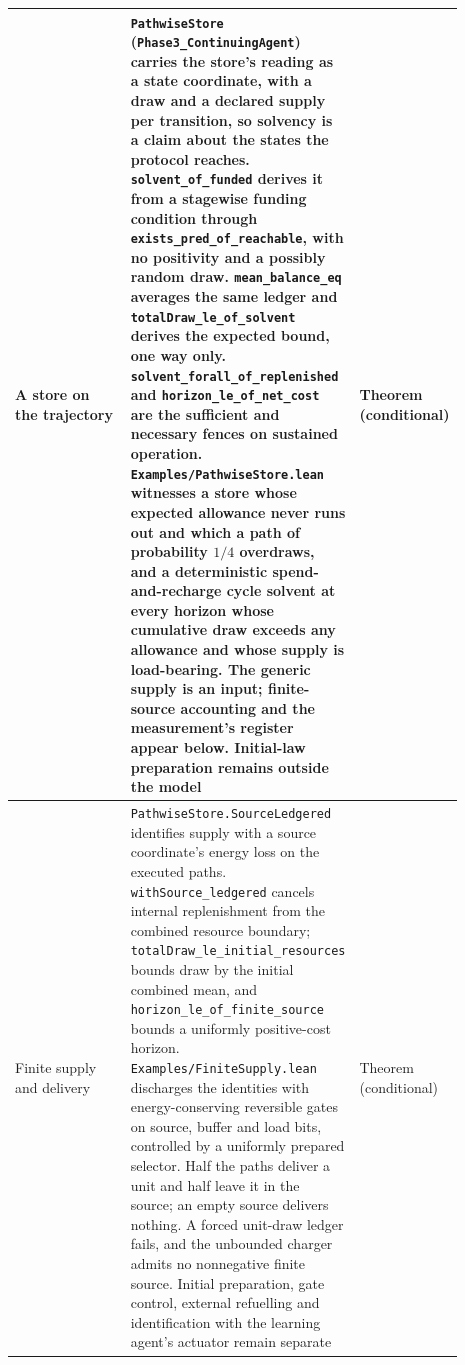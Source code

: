 \documentclass{article}
\begin{document}
\begin{longtable}{|>{\raggedright\arraybackslash}p{0.26\linewidth}|>{\raggedright\arraybackslash}p{0.46\linewidth}|>{\raggedright\arraybackslash}p{0.17\linewidth}|}
A store on the trajectory & \texttt{PathwiseStore} (\nolinkurl{Phase3_ContinuingAgent}) carries the store's reading as a state coordinate, with a draw and a declared supply per transition, so solvency is a claim about the states the protocol reaches. \nolinkurl{solvent_of_funded} derives it from a stagewise funding condition through \nolinkurl{exists_pred_of_reachable}, with no positivity and a possibly random draw. \nolinkurl{mean_balance_eq} averages the same ledger and \nolinkurl{totalDraw_le_of_solvent} derives the expected bound, one way only. \nolinkurl{solvent_forall_of_replenished} and \nolinkurl{horizon_le_of_net_cost} are the sufficient and necessary fences on sustained operation. \texttt{Examples/PathwiseStore.lean} witnesses a store whose expected allowance never runs out and which a path of probability $1/4$ overdraws, and a deterministic spend-and-recharge cycle solvent at every horizon whose cumulative draw exceeds any allowance and whose supply is load-bearing. The generic supply is an input; finite-source accounting and the measurement's register appear below. Initial-law preparation remains outside the model & Theorem (conditional) \\ \hline
Finite supply and delivery & \texttt{PathwiseStore.SourceLedgered} identifies supply with a source coordinate's energy loss on the executed paths. \nolinkurl{withSource_ledgered} cancels internal replenishment from the combined resource boundary; \nolinkurl{totalDraw_le_initial_resources} bounds draw by the initial combined mean, and \nolinkurl{horizon_le_of_finite_source} bounds a uniformly positive-cost horizon. \texttt{Examples/FiniteSupply.lean} discharges the identities with energy-conserving reversible gates on source, buffer and load bits, controlled by a uniformly prepared selector. Half the paths deliver a unit and half leave it in the source; an empty source delivers nothing. A forced unit-draw ledger fails, and the unbounded charger admits no nonnegative finite source. Initial preparation, gate control, external refuelling and identification with the learning agent's actuator remain separate & Theorem (conditional) \\ \hline

\end{longtable}
\end{document}
